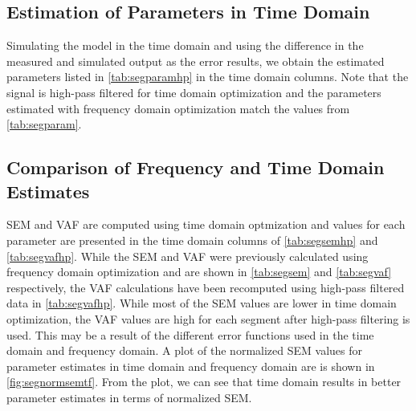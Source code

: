 \documentclass[11pt,a4paper]{article}
\begin{document}
\subsection{Estimation of Parameters in Time Domain}
Simulating the model in the time domain and using the difference in the
measured and simulated output as the error results, we obtain the estimated
parameters listed in \autoref{tab:segparamhp} in the time domain columns.
Note that the signal is high-pass filtered for time domain optimization and the
parameters estimated with frequency domain optimization match the values from
\autoref{tab:segparam}.

\subsection{Comparison of Frequency and Time Domain Estimates}
SEM and VAF are computed using time domain optmization and values for each
parameter are presented in the time domain columns of \autoref{tab:segsemhp}
and \autoref{tab:segvafhp}. While the SEM and VAF were previously calculated
using frequency domain optimization and are shown in \autoref{tab:segsem} and
\autoref{tab:segvaf} respectively, the VAF calculations have been recomputed
using high-pass filtered data in \autoref{tab:segvafhp}. While most of the SEM
values are lower in time domain optimization, the VAF values are high for each
segment after high-pass filtering is used. This may be a result of the
different error functions used in the time domain and frequency domain. A plot
of the normalized SEM values for parameter estimates in time domain and
frequency domain are is shown in \autoref{fig:segnormsemtf}. From the plot, we
can see that time domain results in better parameter estimates in terms of
normalized SEM.
\end{document}
